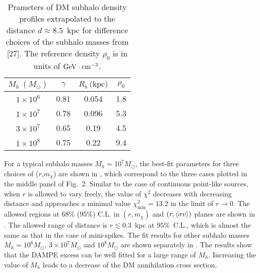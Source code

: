 \begin{table}[htb]
	\centering
		\begin{tabular}{c|ccc}
		\hline\hline
		$M_{h}~(M_{\odot})$ & $\gamma$ & $R_{b}~\text{(kpc)}$ & $\rho_{0}$\\
		\hline
		$1\times 10^{6}$ 	& 0.81 	&	0.054	& 1.8\\
		$1\times 10^{7}$ 	& 0.78 	&	0.096 	& 5.3 \\
		$3\times 10^{7}$ 	& 0.65	&	0.19         & 4.5 \\
		$1\times 10^{8}$ 	& 0.75	&	0.22         & 9.4 \\
		\hline\hline
		\end{tabular}
	\caption{Prameters of DM subhalo density profiles extrapolated to the distance $d\approx 8.5$~kpc 
	for difference choices of the subhalo masses
	from [27]. %
	The reference density $\rho_{0}$ is in units of $\text{GeV}\cdot\text{cm}^{-3}$.
	}
\label{tab:subhalo-profile}
\end{table}
For a typical subhalo masses $M_{h}=10^{7} M_{\odot}$,  
the best-fit parameters 
for three choices of ($r$,$m_{\chi}$) are shown in ,
which correspond to the three cases plotted in the middle panel of Fig.~2. %
Similar to the case of continuous point-like sources,
when $r$ is allowed to vary freely, 
the value of $\chi^{2}$ decreases with decreasing distance and
approaches a minimal value $\chi^{2}_{\text{min}}=13.2$  in the limit of  $r\to 0$. 
The  allowed regions at $68\%$ ($95\%$) C.L. in $(r, m_{\chi})$ and $(r, \langle \sigma v \rangle)$ planes 
are shown  in .
The allowed range of distance is $r \lesssim 0.3$~kpc at $95\%$~C.L., 
which is almost the same as that in the case of mini-spikes.
The fit results for other subhalo masses 
$M_{h}=10^{6} M_{\odot}$, $3\times 10^{7} M_{\odot}$ and $10^{8} M_{\odot}$
are shown separately in .
The results show that the DAMPE excess can be well fitted for a large range of $M_{h}$.
Increasing the value of $M_{h}$ leads to a decrease of the DM annihilation cross section.


